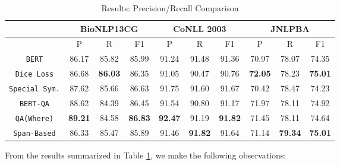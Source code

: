 \begin{table}[h!]
\centering
\begin{tabular}{|c|c|c|c|c|c|c|c|c|c|}\hline
     & \multicolumn{3}{c|}{\textbf{BioNLP13CG}} & \multicolumn{3}{c|}{\textbf{CoNLL 2003}} & \multicolumn{3}{c|}{\textbf{JNLPBA}}\\\hline
	 & P & R & F1 & P & R & F1 & P & R & F1\\\hline
	\texttt{BERT} & 86.17 & 85.82 & 85.99 & 91.24 & 91.48 & 91.36 & 70.97 & 78.07 & 74.35\\\hline
	\texttt{Dice Loss} & 86.68 & \textbf{86.03} & 86.35 & 91.05 & 90.47 & 90.76 & \textbf{72.05} & 78.23 & \textbf{75.01}\\\hline
	\texttt{Special Sym.} & 87.62 & 85.66 & 86.63 & 91.75 & 91.60 & 91.67 & 70.42 & 78.47 & 74.23\\\hline
	\texttt{BERT-QA} & 88.62 & 84.39 & 86.45 & 91.54 & 90.80 & 91.17 & 71.97 & 78.11 & 74.92\\\hline
	\texttt{QA(Where)} & \textbf{89.21} & 84.58 & \textbf{86.83} & \textbf{92.47} & 91.19 & \textbf{91.82} & 71.45 & 78.11 & 74.64\\\hline
	\texttt{Span-Based} & 86.33 & 85.47 & 85.89 & 91.46 & \textbf{91.82} & 91.64 & 71.14 & \textbf{79.34} & \textbf{75.01}\\\hline
	\end{tabular}
    \caption{Results: Precision/Recall Comparison}
    \label{tab:res_precision_recall}
\end{table}

From the results summarized in Table \ref{tab:res_precision_recall}, we make the following observations:

